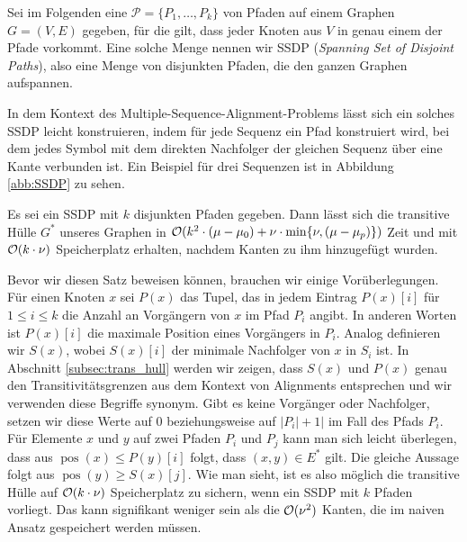\begin{definition}
Sei im Folgenden eine $\mathcal{P} = \{P_1, \dots, P_k\}$ von Pfaden auf einem Graphen $G=(V,E)$ gegeben, für die gilt, dass jeder Knoten aus $V$ in genau einem der Pfade vorkommt. Eine solche Menge nennen wir SSDP (\emph{Spanning Set of Disjoint Paths}), also eine Menge von disjunkten Pfaden, die den ganzen Graphen aufspannen. 
\end{definition}

In dem Kontext des Multiple-Sequence-Alignment-Problems lässt sich ein solches SSDP leicht konstruieren, indem für jede Sequenz ein Pfad konstruiert wird, bei dem jedes Symbol mit dem direkten Nachfolger der gleichen Sequenz über eine Kante verbunden ist. Ein Beispiel für drei Sequenzen ist in Abbildung \ref{abb:SSDP} zu sehen.

\begin{satz}[{\cite{a97}}]
	\label{satz:ssdp}
	Es sei ein SSDP mit $k$ disjunkten Pfaden gegeben. Dann lässt sich die transitive Hülle $G^*$ unseres Graphen in $\mathcal{O}(k^2\cdot(\mu - \mu_0) + \nu \cdot \min\{\nu, (\mu - \mu_p)\})$ Zeit und mit $\mathcal{O}(k\cdot \nu)$ Speicherplatz erhalten, nachdem Kanten zu ihm hinzugefügt wurden.
\end{satz}

Bevor wir diesen Satz beweisen können, brauchen wir einige Vorüberlegungen. Für einen Knoten $x$ sei $P(x)$ das Tupel, das in jedem Eintrag $P(x)[i]$ für $1\leq i \leq k$ die Anzahl an Vorgängern von $x$ im Pfad $P_i$ angibt. In anderen Worten ist $P(x)[i]$ die maximale Position eines Vorgängers in $P_i$. Analog definieren wir $S(x)$, wobei  $S(x)[i]$ der minimale Nachfolger von $x$ in $S_i$ ist. In Abschnitt \ref{subsec:trans_hull} werden wir zeigen, dass $S(x)$ und $P(x)$ genau den Transitivitätsgrenzen aus dem Kontext von Alignments entsprechen und wir verwenden diese Begriffe synonym. Gibt es keine Vorgänger oder Nachfolger, setzen wir diese Werte auf 0 beziehungsweise auf $|P_i|+1|$ im Fall des Pfads $P_i$. Für Elemente $x$ und $y$ auf zwei Pfaden $P_i$ und $P_j$ kann man sich leicht überlegen, dass aus $\operatorname{pos}(x) \leq P(y)[i]$ folgt, dass $(x,y)\in E^*$ gilt. Die gleiche Aussage folgt aus $\operatorname{pos}(y) \geq S(x)[j]$. Wie man sieht, ist es also möglich die transitive Hülle auf $\mathcal{O}(k \cdot \nu)$ Speicherplatz zu sichern, wenn ein SSDP mit $k$ Pfaden vorliegt. Das kann signifikant weniger sein als die $\mathcal{O}(\nu^2)$ Kanten, die im naiven Ansatz gespeichert werden müssen.

